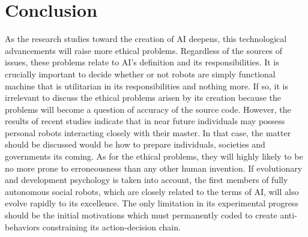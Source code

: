 \documentclass[man]{apa6}
\begin{document}
\section{Conclusion}
As the research studies toward the creation of AI deepens, this technological advancements will raise more ethical problems. Regardless of the sources of issues, these problems relate to AI's definition and its responsibilities. It is crucially important to decide whether or not robots are simply functional machine that is utilitarian in its responsibilities and nothing more. If so, it is irrelevant to discuss the ethical problems arisen by its creation because the problems will become a question of accuracy of the source code. However, the results of recent studies indicate that in near future individuals may possess personal robots interacting closely with their master. In that case, the matter should be discussed would be how to prepare individuals, societies and governments its coming. As for the ethical problems, they will highly likely to be no more prone to erroneousness than any other human invention. If evolutionary and development psychology is taken into account, the first members of fully autonomous social robots, which are closely related to the terms of AI, will also evolve rapidly to its excellence. The only limitation in its experimental progress should be the initial motivations which must permanently coded to create anti-behaviors constraining its action-decision chain.


\end{document}
